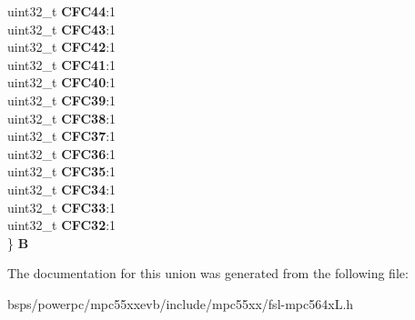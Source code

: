\begin{DoxyCompactItemize}
\begin{tabbing}
\>uint32\_t {\bfseries CFC44}:1\\
\>uint32\_t {\bfseries CFC43}:1\\
\>uint32\_t {\bfseries CFC42}:1\\
\>uint32\_t {\bfseries CFC41}:1\\
\>uint32\_t {\bfseries CFC40}:1\\
\>uint32\_t {\bfseries CFC39}:1\\
\>uint32\_t {\bfseries CFC38}:1\\
\>uint32\_t {\bfseries CFC37}:1\\
\>uint32\_t {\bfseries CFC36}:1\\
\>uint32\_t {\bfseries CFC35}:1\\
\>uint32\_t {\bfseries CFC34}:1\\
\>uint32\_t {\bfseries CFC33}:1\\
\>uint32\_t {\bfseries CFC32}:1\\
\} {\bfseries B}\\

\end{tabbing}\end{DoxyCompactItemize}


The documentation for this union was generated from the following file\+:\begin{DoxyCompactItemize}
\item 
bsps/powerpc/mpc55xxevb/include/mpc55xx/fsl-\/mpc564x\+L.\+h\end{DoxyCompactItemize}
